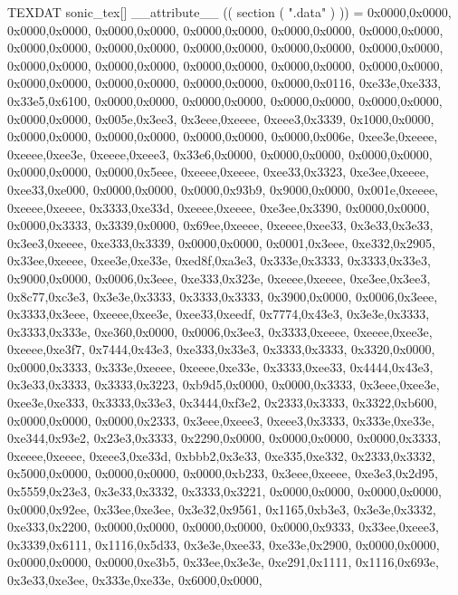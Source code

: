TEXDAT sonic_tex[] __attribute__ (( section ( ".data" ) )) ={
	0x0000,0x0000,
	0x0000,0x0000,
	0x0000,0x0000,
	0x0000,0x0000,
	0x0000,0x0000,
	0x0000,0x0000,
	0x0000,0x0000,
	0x0000,0x0000,
	0x0000,0x0000,
	0x0000,0x0000,
	0x0000,0x0000,
	0x0000,0x0000,
	0x0000,0x0000,
	0x0000,0x0000,
	0x0000,0x0000,
	0x0000,0x0000,
	0x0000,0x0000,
	0x0000,0x0000,
	0x0000,0x0000,
	0x0000,0x0116,
	0xe33e,0xe333,
	0x33e5,0x6100,
	0x0000,0x0000,
	0x0000,0x0000,
	0x0000,0x0000,
	0x0000,0x0000,
	0x0000,0x0000,
	0x005e,0x3ee3,
	0x3eee,0xeeee,
	0xeee3,0x3339,
	0x1000,0x0000,
	0x0000,0x0000,
	0x0000,0x0000,
	0x0000,0x0000,
	0x0000,0x006e,
	0xee3e,0xeeee,
	0xeeee,0xee3e,
	0xeeee,0xeee3,
	0x33e6,0x0000,
	0x0000,0x0000,
	0x0000,0x0000,
	0x0000,0x0000,
	0x0000,0x5eee,
	0xeeee,0xeeee,
	0xee33,0x3323,
	0xe3ee,0xeeee,
	0xee33,0xe000,
	0x0000,0x0000,
	0x0000,0x93b9,
	0x9000,0x0000,
	0x001e,0xeeee,
	0xeeee,0xeeee,
	0x3333,0xe33d,
	0xeeee,0xeeee,
	0xe3ee,0x3390,
	0x0000,0x0000,
	0x0000,0x3333,
	0x3339,0x0000,
	0x69ee,0xeeee,
	0xeeee,0xee33,
	0x3e33,0x3e33,
	0x3ee3,0xeeee,
	0xe333,0x3339,
	0x0000,0x0000,
	0x0001,0x3eee,
	0xe332,0x2905,
	0x33ee,0xeeee,
	0xee3e,0xe33e,
	0xed8f,0xa3e3,
	0x333e,0x3333,
	0x3333,0x33e3,
	0x9000,0x0000,
	0x0006,0x3eee,
	0xe333,0x323e,
	0xeeee,0xeeee,
	0xe3ee,0x3ee3,
	0x8c77,0xc3e3,
	0x3e3e,0x3333,
	0x3333,0x3333,
	0x3900,0x0000,
	0x0006,0x3eee,
	0x3333,0x3eee,
	0xeeee,0xee3e,
	0xee33,0xeedf,
	0x7774,0x43e3,
	0x3e3e,0x3333,
	0x3333,0x333e,
	0xe360,0x0000,
	0x0006,0x3ee3,
	0x3333,0xeeee,
	0xeeee,0xee3e,
	0xeeee,0xe3f7,
	0x7444,0x43e3,
	0xe333,0x33e3,
	0x3333,0x3333,
	0x3320,0x0000,
	0x0000,0x3333,
	0x333e,0xeeee,
	0xeeee,0xe33e,
	0x3333,0xee33,
	0x4444,0x43e3,
	0x3e33,0x3333,
	0x3333,0x3223,
	0xb9d5,0x0000,
	0x0000,0x3333,
	0x3eee,0xee3e,
	0xee3e,0xe333,
	0x3333,0x33e3,
	0x3444,0xf3e2,
	0x2333,0x3333,
	0x3322,0xb600,
	0x0000,0x0000,
	0x0000,0x2333,
	0x3eee,0xeee3,
	0xeee3,0x3333,
	0x333e,0xe33e,
	0xe344,0x93e2,
	0x23e3,0x3333,
	0x2290,0x0000,
	0x0000,0x0000,
	0x0000,0x3333,
	0xeeee,0xeeee,
	0xeee3,0xe33d,
	0xbbb2,0x3e33,
	0xe335,0xe332,
	0x2333,0x3332,
	0x5000,0x0000,
	0x0000,0x0000,
	0x0000,0xb233,
	0x3eee,0xeeee,
	0xe3e3,0x2d95,
	0x5559,0x23e3,
	0x3e33,0x3332,
	0x3333,0x3221,
	0x0000,0x0000,
	0x0000,0x0000,
	0x0000,0x92ee,
	0x33ee,0xe3ee,
	0x3e32,0x9561,
	0x1165,0xb3e3,
	0x3e3e,0x3332,
	0xe333,0x2200,
	0x0000,0x0000,
	0x0000,0x0000,
	0x0000,0x9333,
	0x33ee,0xeee3,
	0x3339,0x6111,
	0x1116,0x5d33,
	0x3e3e,0xee33,
	0xe33e,0x2900,
	0x0000,0x0000,
	0x0000,0x0000,
	0x0000,0xe3b5,
	0x33ee,0x3e3e,
	0xe291,0x1111,
	0x1116,0x693e,
	0x3e33,0xe3ee,
	0x333e,0xe33e,
	0x6000,0x0000,
}
